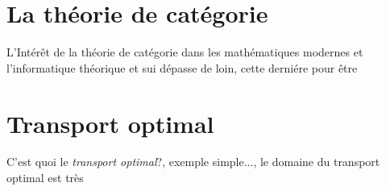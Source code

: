 \section{La théorie de catégorie}
L’Intérêt de la théorie de catégorie dans les mathématiques modernes et l'informatique théorique et sui dépasse de loin, cette derniére pour \^etre
\section{Transport optimal}
C'est quoi le \textit{ transport optimal}?, exemple simple..., le domaine du transport optimal
est très 